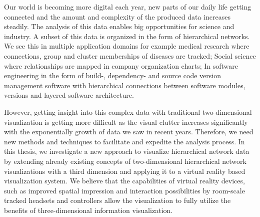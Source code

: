 Our world is becoming more digital each year, new parts of our daily life getting connected and the amount and complexity of the produced data increases steadily.
The analysis of this data enables big opportunities for science and industry.
A subset of this data is organized in the form of hierarchical networks. We see this in multiple application domains for example medical research where connections, group and cluster memberships of diseases are tracked; Social science where relationships are mapped in company organization charts; In software engineering in the form of build-, dependency- and source code version management software with hierarchical connections between software modules, versions and layered software architecture.

However, getting insight into this complex data with traditional two-dimensional visualization is getting more difficult as the visual clutter increases significantly with the exponentially growth of data we saw in recent years. Therefore, we need new methods and techniques to facilitate and expedite the analysis process.
In this thesis, we investigate a new approach to visualize hierarchical network data by extending already existing concepts of two-dimensional hierarchical network visualizations with a third dimension and applying it to a virtual reality based visualization system. We believe that the capabilities of virtual reality devices, such as improved spatial impression and interaction possibilities by room-scale tracked headsets and controllers allow the visualization to fully utilize the benefits of three-dimensional information visualization.